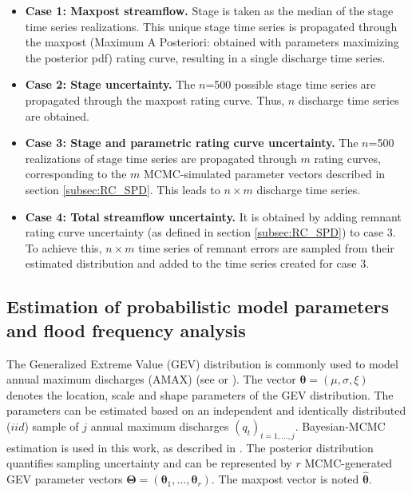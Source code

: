 \documentclass[11pt]{article}
\begin{document}
   \begin{itemize}
       \item \textbf{Case 1: Maxpost streamflow.} Stage is taken as the median of the stage time series realizations. This unique stage time series is propagated through the maxpost (Maximum A Posteriori: obtained with parameters maximizing the posterior pdf) rating curve, resulting in a single discharge time series. 
       
       \item \textbf{Case 2: Stage uncertainty.} The $n$=500 possible stage time series are propagated through the maxpost rating curve. Thus, $n$ discharge time series are obtained.
       
       \item \textbf{Case 3: Stage and parametric rating curve uncertainty.} The $n$=500 realizations of stage time series are propagated through $m$ rating curves, corresponding to the $m$ MCMC-simulated parameter vectors described in section \ref{subsec:RC_SPD}. This leads to $n \times m$ discharge time series. 
       
       \item \textbf{Case 4: Total streamflow uncertainty.} It is obtained by adding remnant rating curve uncertainty (as defined in section \ref{subsec:RC_SPD}) to case 3. To achieve this, $n \times m$ time series of remnant errors are sampled from their estimated distribution and added to the time series created for case 3. 
   \end{itemize}
   
    \subsection{Estimation of probabilistic model parameters and flood frequency analysis}
    \label{subsec:FFA}
    
    The Generalized Extreme Value (GEV) distribution is commonly used to model annual maximum discharges (AMAX) (see \citet{hamed_flood_2019} or \citet{jain_design_2019}). The vector $\boldsymbol{\theta} = (\mu,\sigma,\xi)$ denotes the location, scale and shape parameters of the GEV distribution. The parameters can be estimated based on an independent and identically distributed ($iid$) sample of $j$ annual maximum discharges $(q_t)_{t=1,...,j}$. Bayesian-MCMC estimation is used in this work, as described in \citet{coles_classical_2001}. The posterior distribution quantifies sampling uncertainty and can be represented by $r$ MCMC-generated GEV parameter vectors $\boldsymbol{\Theta} = (\boldsymbol{\theta}_1,...,\boldsymbol{\theta}_r)$. The maxpost vector is noted $\boldsymbol{\hat{\theta}}$.
    
\end{document}
